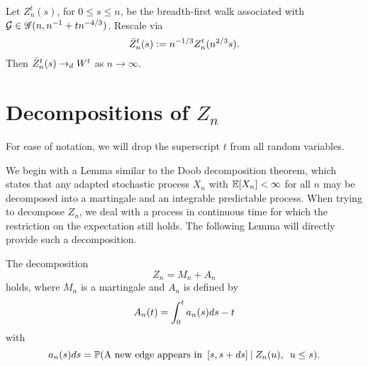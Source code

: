 \begin{theorem} \label{T: Z -> W}
	Let $Z_n^t(s)$, for $0 \leq s \leq n$, 
	be the breadth-first walk associated with $\mathcal{G} \in \mathscr{G}(n, n^{-1} + tn^{-4/3})$.
	Rescale via
	\begin{equation*}
	\bar{Z}^t_n(s) := n^{-1 / 3} Z_n^t(n^{2 / 3}s).
	\end{equation*}
	Then $\bar{Z}^t_n(s) \rightarrow_d W^t$ as $n \rightarrow \infty$.
\end{theorem}



\section{Decompositions of $Z_n$}

For ease of notation, we will drop the superscript $t$ from all random variables.



We begin with a Lemma similar to the Doob decomposition theorem,
which states that any adapted stochastic process $X_n$ with $\mathbb{E}[X_n] < \infty$ for all $n$
may be decomposed into a martingale and an integrable predictable process.
When trying to decompose $Z_n$, we deal with a process in continuous time for which the restriction on the expectation still holds.
The following Lemma will directly provide such a decomposition.

\begin{lemma} \label{L: decomp Zn}
	The decomposition 
	\begin{equation} \label{E: decomp Zn}
	Z_n = M_n + A_n
	\end{equation}
	holds, where $M_n$ is a martingale and $A_n$ is defined by
	\begin{equation} \label{D: An}
	A_n(t) = \int_{0}^{t} a_n(s)ds - t
	\end{equation}
	with
	\begin{equation} \label{D: an}
	a_n(s)ds = \mathbb{P}(\text{A new edge appears in} \enspace [s, s+ds] \: | \: Z_n(u), \enspace u \leq s).
	\end{equation}
\end{lemma}


